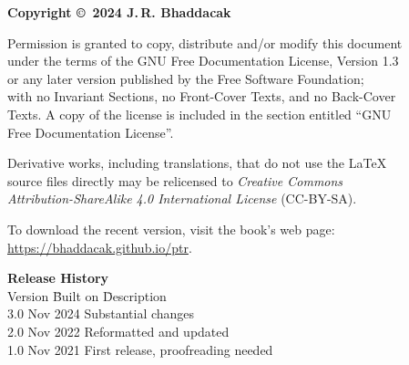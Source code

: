 \thispagestyle{empty}
{\footnotesize
\noindent\textbf{Copyright \copyright\ 2024 J.\,R. Bhaddacak}

\parskip=3mm
\noindent 
Permission is granted to copy, distribute and/or modify this document\\
under the terms of the GNU Free Documentation License, Version 1.3\\
or any later version published by the Free Software Foundation;\\
with no Invariant Sections, no Front-Cover Texts, and no Back-Cover\\
Texts.  A copy of the license is included in the section entitled ``GNU\\
Free Documentation License''.

\parskip=3mm
\noindent 
Derivative works, including translations, that do not use the \LaTeX\\
source files directly may be relicensed to \emph{Creative Commons\\
Attribution-ShareAlike 4.0 International License} (CC-BY-SA).

\parskip=3mm
\noindent 
To download the recent version, visit the book's web page:\\
\url{https://bhaddacak.github.io/ptr}.

\begin{tabbing}
\textbf{Release History}\\
Version \hspace{4mm} \= Built on \hspace{15mm} \= Description\\
3.0  Nov 2024 \> Substantial changes \\
2.0  Nov 2022 \> Reformatted and updated \\
1.0  Nov 2021 \> First release, proofreading needed \\
\end{tabbing}
}
